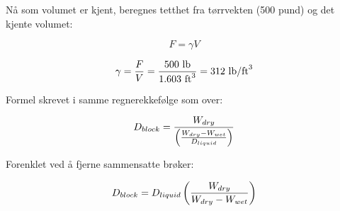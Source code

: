 Nå som volumet er kjent, beregnes tetthet fra tørrvekten (500 pund) og det kjente volumet:

$$F = \gamma V$$

$$\gamma = {F \over V} = {500 \hbox{ lb} \over 1.603 \hbox{ ft}^3} = 312 \hbox{ lb/ft}^3$$

\vskip 10pt

Formel skrevet i samme regnerekkefølge som over:

$$D_{block} = {W_{dry} \over \left({{W_{dry} - W_{wet}} \over D_{liquid}}\right)}$$

\vskip 10pt

Forenklet ved å fjerne sammensatte brøker:

$$D_{block} = D_{liquid}\left({W_{dry} \over {W_{dry} - W_{wet}}}\right)$$


